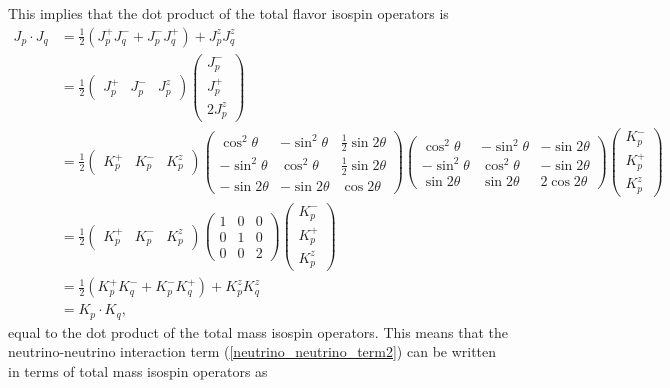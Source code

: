 \documentclass[Dual]{msu-thesis}
\begin{document}
This implies that the dot product of the total flavor isospin operators is
\begin{align}
J_p\cdot J_q
&=
\frac{1}{2}
(J^+_pJ^-_q+J^-_pJ^+_q)+J^z_pJ^z_q
\nonumber
\\
&=
\frac{1}{2}
\begin{pmatrix}
J^+_p & J^-_p & J^z_p
\end{pmatrix}
\begin{pmatrix}
J^-_p 
\\ 
J^+_p 
\\ 
2J^z_p
\end{pmatrix}
\nonumber
\\
&=
\frac{1}{2}
\begin{pmatrix}
K^+_p & K^-_p & K^z_p
\end{pmatrix}
\begin{pmatrix}
\cos^2\theta & -\sin^2\theta & \frac{1}{2}\sin2\theta \\
-\sin^2\theta & \cos^2\theta & \frac{1}{2}\sin2\theta \\
-\sin2\theta & -\sin2\theta & \cos2\theta
\end{pmatrix}
\begin{pmatrix}
\cos^2\theta & -\sin^2\theta & -\sin2\theta \\
-\sin^2\theta & \cos^2\theta & -\sin2\theta \\
\sin2\theta & \sin2\theta & 2\cos2\theta
\end{pmatrix}
\begin{pmatrix}
K^-_p 
\\ 
K^+_p 
\\ 
K^z_p
\end{pmatrix}
\nonumber
\\
&=
\frac{1}{2}
\begin{pmatrix}
K^+_p & K^-_p & K^z_p
\end{pmatrix}
\begin{pmatrix}
1 & 0 & 0 \\
0 & 1 & 0 \\
0 & 0 & 2
\end{pmatrix}
\begin{pmatrix}
K^-_p 
\\ 
K^+_p 
\\ 
K^z_p
\end{pmatrix}
\nonumber
\\
&=
\frac{1}{2}
(K^+_pK^-_q+K^-_pK^+_q)+K^z_pK^z_q
\\
&=
K_p\cdot K_q
,\end{align}
equal to the dot product of the total mass isospin operators. This means that the neutrino-neutrino interaction term (\ref{neutrino_neutrino_term2}) can be written in terms of total mass isospin operators as 
\end{document}
